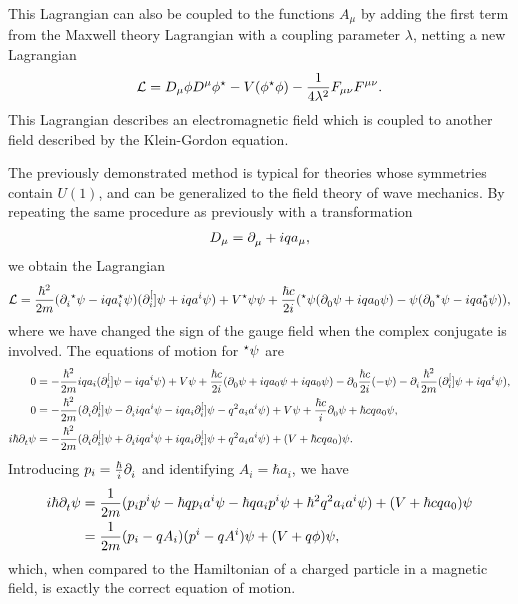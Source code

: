 This Lagrangian can also be coupled to the functions $A_{\mu}$ by adding the first term from the Maxwell theory Lagrangian with a coupling parameter $\lambda$, netting a new Lagrangian
\begin{align*}
	\mathcal{L} = D_{\mu}\phi D^{\mu}\phi^{\star} - V(\phi^{\star}\phi) - \frac{1}{4\lambda^{2}}F_{\mu\nu}F^{\mu\nu}.
\end{align*}
This Lagrangian describes an electromagnetic field which is coupled to another field described by the Klein-Gordon equation.

The previously demonstrated method is typical for theories whose symmetries contain $U(1)$, and can be generalized to the field theory of wave mechanics. By repeating the same procedure as previously with a transformation
\begin{align*}
	D_{\mu} = \partial^{}_{\mu}{} + iqa_{\mu},
\end{align*}
we obtain the Lagrangian
\begin{align*}
	\mathcal{L} = \frac{\hbar^{2}}{2m}(\partial^{}_{i}{^{\star}{\psi}} - iqa_{i}^{\star}{\psi})(\partial^{[}_{i}]{}{\psi} + iqa^{i}\psi) + V^{\star}{\psi}\psi + \frac{\hbar c}{2i}(^{\star}{\psi}(\partial^{}_{0}{\psi} + iqa_{0}\psi) - \psi(\partial^{}_{0}{^{\star}{\psi}} - iqa_{0}^{\star}{\psi})),
\end{align*}
where we have changed the sign of the gauge field when the complex conjugate is involved. The equations of motion for $^{\star}{\psi}$ are
\begin{align*}
	0 &= -\frac{\hbar^{2}}{2m}iqa_{i}(\partial^{[}_{i}]{}{\psi} - iqa^{i}\psi) + V\psi + \frac{\hbar c}{2i}(\partial^{}_{0}{\psi} + iqa_{0}\psi + iqa_{0}\psi) - \partial^{}_{0}{\frac{\hbar c}{2i}( - \psi)} - \partial^{}_{i}{\frac{\hbar^{2}}{2m}(\partial^{[}_{i}]{}{\psi} + iqa^{i}\psi)}, \\
	0 &= -\frac{\hbar^{2}}{2m}(\partial^{}_{i}{\partial^{[}_{i}]{}{\psi}} - \partial^{}_{i}{iqa^{i}\psi} - iqa_{i}\partial^{[}_{i}]{}{\psi} - q^{2}a_{i}a^{i}\psi) + V\psi + \frac{\hbar c}{i}\partial^{}_{0}{\psi} + \hbar cqa_{0}\psi, \\
	i\hbar\partial^{}_{t}{\psi} &= -\frac{\hbar^{2}}{2m}(\partial^{}_{i}{\partial^{[}_{i}]{}{\psi}} + \partial^{}_{i}{iqa^{i}\psi} + iqa_{i}\partial^{[}_{i}]{}{\psi} + q^{2}a_{i}a^{i}\psi) + (V + \hbar cqa_{0})\psi.
\end{align*}
Introducing $p_{i} = \frac{\hbar}{i}\partial^{}_{i}{}$ and identifying $A_{i} = \hbar a_{i}$, we have
\begin{align*}
	i\hbar\partial^{}_{t}{\psi} &= \frac{1}{2m}(p_{i}p^{i}\psi - \hbar qp_{i}a^{i}\psi - \hbar qa_{i}p^{i}\psi + \hbar^{2}q^{2}a_{i}a^{i}\psi) + (V + \hbar cqa_{0})\psi \\
	                    &= \frac{1}{2m}(p_{i} - qA_{i})(p^{i} - qA^{i})\psi + (V + q\phi)\psi,
\end{align*}
which, when compared to the Hamiltonian of a charged particle in a magnetic field, is exactly the correct equation of motion.

